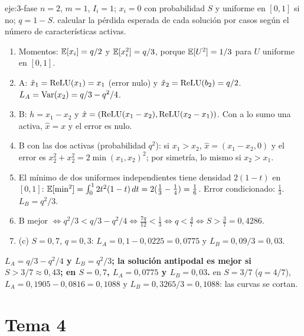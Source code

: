 \begin{solucion}{eje:3-fase}
\datos $n=2$, $m=1$, $I_i=1$; $x_i=0$ con probabilidad $S$ y uniforme en $[0,1]$ si no; $q=1-S$.
\planteamiento calcular la pérdida esperada de cada solución por casos según el número de características activas.
\pasos
\begin{enumerate}[label=\arabic*.]
  \item Momentos: $\mathbb{E}[x_i]=q/2$ y $\mathbb{E}[x_i^{2}]=q/3$, porque $\mathbb{E}[U^{2}]=1/3$ para $U$ uniforme en $[0,1]$.
  \item A: $\hat x_1=\operatorname{ReLU}(x_1)=x_1$ (error nulo) y $\hat x_2=\operatorname{ReLU}(b_2)=q/2$. $L_A=\operatorname{Var}(x_2)=q/3-q^{2}/4$.
  \item B: $h=x_1-x_2$ y $\hat x=(\operatorname{ReLU}(x_1-x_2),\operatorname{ReLU}(x_2-x_1))$. Con a lo sumo una activa, $\hat x=x$ y el error es nulo.
  \item B con las dos activas (probabilidad $q^{2}$): si $x_1>x_2$, $\hat x=(x_1-x_2,0)$ y el error es $x_2^{2}+x_2^{2}=2\min(x_1,x_2)^{2}$; por simetría, lo mismo si $x_2>x_1$.
  \item El mínimo de dos uniformes independientes tiene densidad $2(1-t)$ en $[0,1]$: $\mathbb{E}[\min^{2}]=\int_0^12t^{2}(1-t)\,dt=2(\tfrac13-\tfrac14)=\tfrac16$. Error condicionado: $\tfrac13$. $L_B=q^{2}/3$.
  \item B mejor $\iff q^{2}/3<q/3-q^{2}/4\iff\tfrac{7q}{12}<\tfrac13\iff q<\tfrac47\iff S>\tfrac37=0{,}4286$.
  \item (c) $S=0{,}7$, $q=0{,}3$: $L_A=0{,}1-0{,}0225=0{,}0775$ y $L_B=0{,}09/3=0{,}03$.
\end{enumerate}
\resultado \textbf{$L_A=q/3-q^{2}/4$ y $L_B=q^{2}/3$; la solución antipodal es mejor si $S>3/7\approx 0{,}43$; en $S=0{,}7$, $L_A=0{,}0775$ y $L_B=0{,}03$.}
\comprobacion en $S=3/7$ ($q=4/7$), $L_A=0{,}1905-0{,}0816=0{,}1088$ y $L_B=0{,}3265/3=0{,}1088$: las curvas se cortan.
\end{solucion}

\section{Tema 4}

